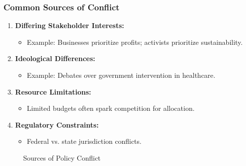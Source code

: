 \documentclass[10pt]{beamer}
\begin{document}
\begin{frame}
\frametitle{Common Sources of Conflict}
\begin{enumerate}
   \item \textbf{Differing Stakeholder Interests:}
       \begin{itemize}
           \item Example: Businesses prioritize profits; activists prioritize sustainability.
       \end{itemize}
   \item \textbf{Ideological Differences:}
       \begin{itemize}
           \item Example: Debates over government intervention in healthcare.
       \end{itemize}
   \item \textbf{Resource Limitations:}
       \begin{itemize}
           \item Limited budgets often spark competition for allocation.
       \end{itemize}
   \item \textbf{Regulatory Constraints:}
       \begin{itemize}
           \item Federal vs. state jurisdiction conflicts.
       \end{itemize}
\end{enumerate}

\begin{figure}
   \centering
   \caption{Sources of Policy Conflict}
\end{figure}
\end{frame}
\end{document}
